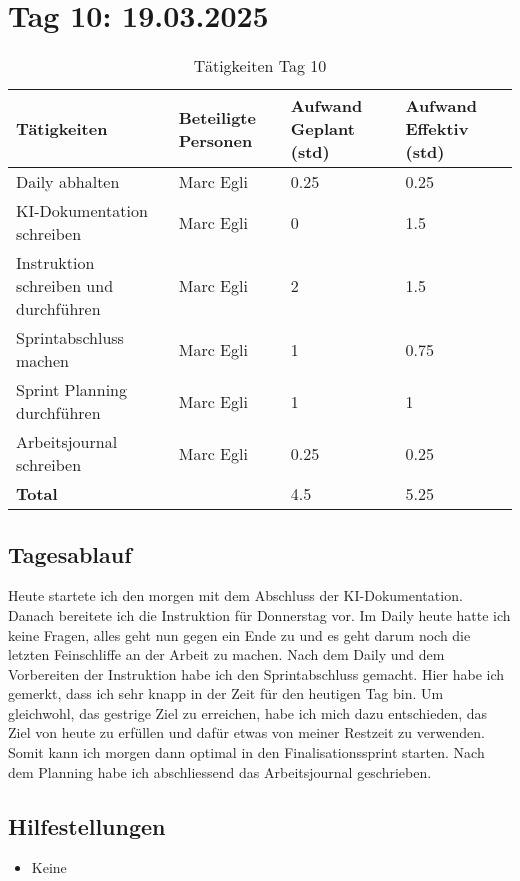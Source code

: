 \section{Tag 10: 19.03.2025}
\begin{table}[H]
    \begin{tabular}{|L{0.4\textwidth}|C{60pt}|C{60pt}|C{60pt}|}
        \hline
        \color{white}Tätigkeiten & \color{white}Beteiligte \color{white}Personen & \color{white}Aufwand Geplant (std) & \color{white}Aufwand Effektiv (std) \\
        \hline
        Daily abhalten  & Marc Egli & 0.25 & 0.25 \\ 
        \hline
        KI-Dokumentation schreiben & Marc Egli & 0 & 1.5 \\
        \hline
        Instruktion schreiben und durchführen & Marc Egli & 2 & 1.5 \\
        \hline
        Sprintabschluss machen & Marc Egli & 1 & 0.75 \\
        \hline
        Sprint Planning durchführen & Marc Egli & 1 & 1 \\
        \hline
        Arbeitsjournal schreiben & Marc Egli & 0.25 & 0.25 \\
        \hline
        \textbf{Total} &  & 4.5 &  5.25 \\
        \hline
    \end{tabular}
    \caption{Tätigkeiten Tag 10}
\end{table}

\subsection*{Tagesablauf}
Heute startete ich den morgen mit dem Abschluss der KI-Dokumentation. Danach bereitete ich die Instruktion für Donnerstag vor.
Im Daily heute hatte ich keine Fragen, alles geht nun gegen ein Ende zu und es geht darum noch die letzten Feinschliffe an der Arbeit 
zu machen.
Nach dem Daily und dem Vorbereiten der Instruktion habe ich den Sprintabschluss gemacht. Hier habe ich gemerkt, dass ich sehr knapp in der Zeit für den
heutigen Tag bin. Um gleichwohl, das gestrige Ziel zu erreichen, habe ich mich dazu entschieden, das Ziel von heute zu erfüllen und dafür etwas von meiner
Restzeit zu verwenden. Somit kann ich morgen dann optimal in den Finalisationssprint starten. Nach dem Planning habe ich 
abschliessend das Arbeitsjournal geschrieben. 

\subsection*{Hilfestellungen}
\begin{itemize}
    \item Keine
\end{itemize}

